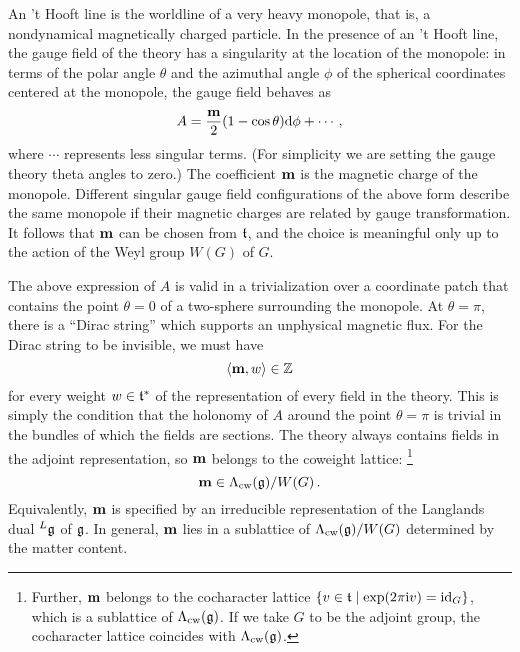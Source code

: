 An 't Hooft line is the worldline of a very heavy monopole, that is, a
nondynamical magnetically charged particle.  In the presence of an 't
Hooft line, the gauge field of the theory has a singularity at the
location of the monopole: in terms of the polar angle $\theta$ and the
azimuthal angle $\phi$ of the spherical coordinates centered at the
monopole, the gauge field behaves as
\begin{equation}
  \label{eq:monopole}
  A = \frac{\mathbf{m}}{2} (1 - \cos\theta) \mathrm{d}\phi + \dotsb \,,
\end{equation}
where $\dotsb$ represents less singular terms.  (For simplicity we are
setting the gauge theory theta angles to zero.)  The coefficient
$\mathbf{m}$ is the magnetic charge of the monopole.  Different singular
gauge field configurations of the above form describe the same
monopole if their magnetic charges are related by gauge
transformation.  It follows that $\mathbf{m}$ can be chosen from $\mathfrak{t}$,
and the choice is meaningful only up to the action of the Weyl group
$W(G)$ of $G$.

The above expression of $A$ is valid in a trivialization over a
coordinate patch that contains the point $\theta = 0$ of a two-sphere
surrounding the monopole.  At $\theta = \pi$, there is a ``Dirac
string'' which supports an unphysical magnetic flux.  For the Dirac
string to be invisible, we must have
\begin{equation}
  \langle\mathbf{m}, w\rangle \in \mathbb{Z}
\end{equation}
for every weight $w \in \mathfrak{t}^*$ of the representation of every field in
the theory.  This is simply the condition that the holonomy of $A$
around the point $\theta = \pi$ is trivial in the bundles of which the
fields are sections.  The theory always contains fields in the adjoint
representation, so $\mathbf{m}$ belongs to the coweight lattice:%
%
\footnote{Further, $\mathbf{m}$ belongs to the cocharacter lattice
  $\{v \in \mathfrak{t} \mid \exp(2\pi\mathrm{i} v) = \mathop{\mathrm{id}}\nolimits_G\}$, which is a sublattice
  of $\Lambda_{\mathrm{cw}}(\mathfrak{g})$.  If we take $G$ to be the adjoint group, the
  cocharacter lattice coincides with $\Lambda_{\mathrm{cw}}(\mathfrak{g})$.}
%
\begin{equation}
  \mathbf{m} \in \Lambda_{\mathrm{cw}}(\mathfrak{g})/W(G) \,. 
\end{equation}
Equivalently, $\mathbf{m}$ is specified by an irreducible representation
of the Langlands dual ${}^L\mathfrak{g}$ of $\mathfrak{g}$.  In general, $\mathbf{m}$ lies
in a sublattice of $\Lambda_{\mathrm{cw}}(\mathfrak{g})/W(G)$ determined by the matter
content.


